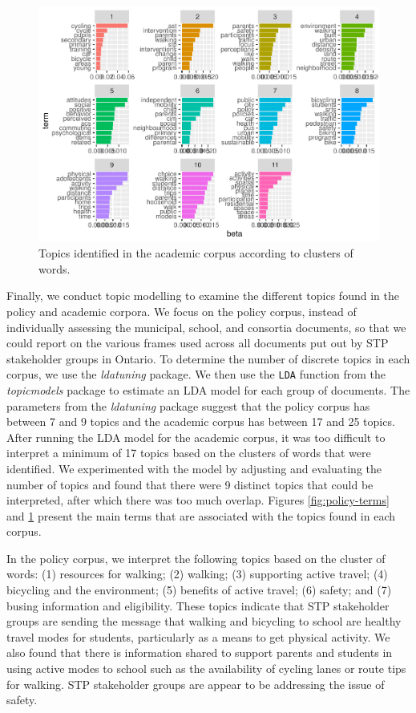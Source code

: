 \documentclass[]{elsarticle} %
\begin{document}
\begin{figure}
\includegraphics[width=1\linewidth]{AST-Framing-Ontario_files/figure-latex/academic-terms-1} \caption{\label{fig:academic-terms}Topics identified in the academic corpus according to clusters of words.}\label{fig:academic-terms}
\end{figure}

Finally, we conduct topic modelling to examine the different topics
found in the policy and academic corpora. We focus on the policy corpus,
instead of individually assessing the municipal, school, and consortia
documents, so that we could report on the various frames used across all
documents put out by STP stakeholder groups in Ontario. To determine the
number of discrete topics in each corpus, we use the \emph{ldatuning}
package. We then use the \texttt{LDA} function from the
\emph{topicmodels} package to estimate an LDA model for each group of
documents. The parameters from the \emph{ldatuning} package suggest that
the policy corpus has between 7 and 9 topics and the academic corpus has
between 17 and 25 topics. After running the LDA model for the academic
corpus, it was too difficult to interpret a minimum of 17 topics based
on the clusters of words that were identified. We experimented with the
model by adjusting and evaluating the number of topics and found that
there were 9 distinct topics that could be interpreted, after which
there was too much overlap. Figures \ref{fig:policy-terms} and
\ref{fig:academic-terms} present the main terms that are associated with
the topics found in each corpus.

In the policy corpus, we interpret the following topics based on the
cluster of words: (1) resources for walking; (2) walking; (3) supporting
active travel; (4) bicycling and the environment; (5) benefits of active
travel; (6) safety; and (7) busing information and eligibility. These
topics indicate that STP stakeholder groups are sending the message that
walking and bicycling to school are healthy travel modes for students,
particularly as a means to get physical activity. We also found that
there is information shared to support parents and students in using
active modes to school such as the availability of cycling lanes or
route tips for walking. STP stakeholder groups are appear to be
addressing the issue of safety.
\end{document}
